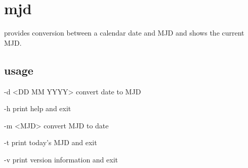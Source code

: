\section{mjd}

 provides conversion between a calendar date and MJD and shows the current MJD.

\subsection{usage}

\begin{description*}
\item[-d \textless DD MM YYYY\textgreater] convert date to MJD
\item[-h] print help and exit
\item[-m \textless MJD\textgreater] convert MJD to date
\item[-t] print today's MJD and exit
\item[-v] print version information and exit
\end{description*}